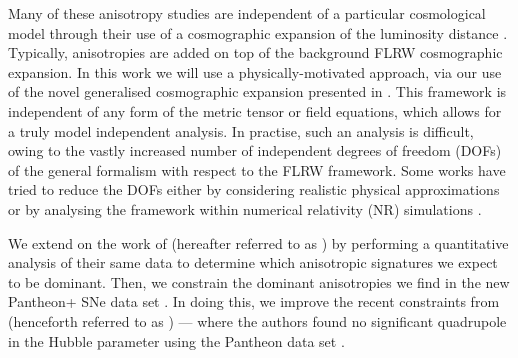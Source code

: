 \documentclass[fleqn,usenatbib]{mnras}
\begin{document}
{Many of these} anisotropy studies %
are independent of a particular cosmological model {through their use of a cosmographic expansion of the luminosity distance \citep[see][and Section~\ref{sec:cosmo_distances}]{Visser_2004}. Typically, anisotropies are added on top of the background FLRW cosmographic expansion. } 
In this work we will use a physically-motivated approach, %
{via our use of} the novel {generalised cosmographic expansion} %
presented in \citet{Heinesen_2021}. This framework is %
independent {of any form of the metric tensor or field equations,} which allows %
for a truly model independent analysis. In practise, such an analysis is difficult, owing to the vastly increased number of independent degrees of freedom (DOFs) of the general formalism {with respect to the FLRW framework}. Some works have tried to reduce the DOFs either by considering realistic physical approximations \citep{Heinesen_Macpherson_2021_Hubble_flow} or by analysing the framework within numerical relativity (NR) simulations \citep{Macpherson_Heinesen_2021}.

We extend on the work of \citet{Macpherson_Heinesen_2021} (hereafter referred to as ) by performing a quantitative analysis {of their same data} 
to determine which anisotropic signatures we expect to be dominant. {Then, we} constrain the {dominant anisotropies we find} in the {new} Pantheon+ {SNe} data set \citep{scolnic2021pantheon+}. %
{In doing this, we} improve the recent constraints from \citet{dhawan2022quadrupole} (henceforth referred to as ) --- where the authors found no significant quadrupole in the Hubble parameter {using the Pantheon data set} \citep{pantheon_2018}. 

\end{document}
